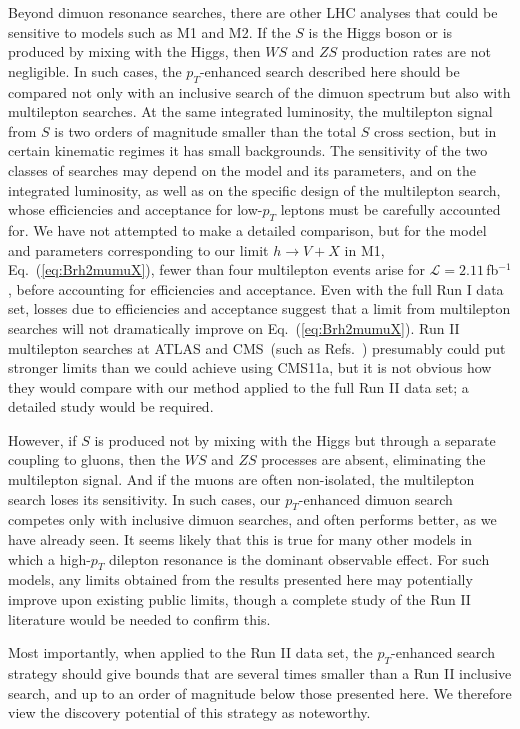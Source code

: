 \documentclass[aps,prd,twocolumn,superscriptaddress,preprintnumbers,nofootinbib,longbibliography,floatfix]{revtex4-1}
\newcommand{\nameofsearch}{$p_T$-enhanced }
\newcommand{\cL}{\mathcal{L}}
\newcommand{\inv}{$^{-1}$}
\DeclareRobustCommand{\Eq}[1]{Eq.~(\ref{#1})}
\DeclareRobustCommand{\Refs}[1]{Refs.~\cite{#1}}
\begin{document}
Beyond dimuon resonance searches, there are other LHC analyses that could be sensitive to models such as M1 and M2.
%
If the $S$ is the Higgs boson or is produced by mixing with the Higgs, then $WS$ and $ZS$ production rates are not negligible.  
%
In such cases, the \nameofsearch search described here should be compared not only with an inclusive search of the dimuon spectrum but also with multilepton searches.  
%
At the same integrated luminosity, the multilepton signal from $S$ is two orders of magnitude smaller than the total $S$ cross section, but in certain kinematic regimes it has small backgrounds.
%
The sensitivity of the two classes of searches may depend on the model and its parameters, and on the integrated luminosity, as well as on the specific design of the multilepton search, whose efficiencies and acceptance for low-$p_T$ leptons must be carefully accounted for.  
%
We have not attempted to make a detailed comparison, but for the model and parameters corresponding to our limit $h\to V+X$ in M1, \Eq{eq:Brh2mumuX}, fewer than four multilepton events arise for $\cL=2.11$\,fb\inv, before accounting for efficiencies and acceptance.  
%
Even with the full Run I data set, losses due to efficiencies and acceptance suggest that a limit from multilepton searches will not dramatically improve on \Eq{eq:Brh2mumuX}. 
%
Run II multilepton searches at ATLAS and CMS~(such as \Refs{Khachatryan:2017qgo,CMS-PAS-EXO-18-005,Sirunyan:2017qkz}) presumably could put stronger limits than we could achieve using CMS11a, but it is not obvious how they would compare with our method applied to the full Run II data set; a detailed study would be required.


However, if $S$ is produced not by mixing with the Higgs but through a separate coupling to gluons, then the $WS$ and $ZS$ processes are absent, eliminating the multilepton signal.
%
And if the muons are often non-isolated, the multilepton search loses its sensitivity.
%
In such cases, our \nameofsearch dimuon search competes only with inclusive dimuon searches, and often performs better, as we have already seen.
%
It seems likely that this is true for many other models in which a high-$p_T$ dilepton resonance is the dominant observable effect.
%
For such models, any limits obtained from the results presented here may potentially improve upon existing public limits, though a complete study of the Run II literature would be needed to confirm this. 

Most importantly, when applied to the Run II data set, the  \nameofsearch  search strategy should give bounds that are several times smaller than a Run II inclusive search, and up to an order of magnitude below those presented here.
%
We therefore view the discovery potential of this strategy as noteworthy. 
\end{document}
